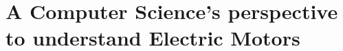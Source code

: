 \chapter{A Computer Science's perspective to understand Electric Motors}
\label{app:electric_motors_for_dummies}

\lipsum[1-5]
